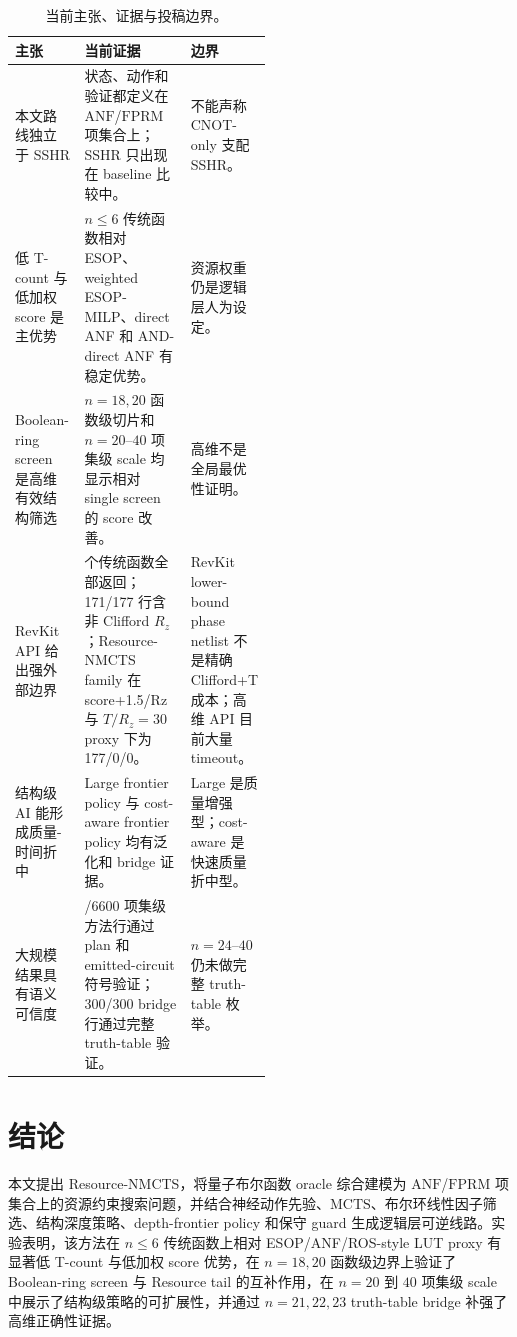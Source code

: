 \documentclass[UTF8,fontset=macnew,11pt]{ctexart}
\newcommand{\method}{Resource-NMCTS}
\newcommand{\screen}{Boolean-ring screen}
\newcommand{\anf}{\ensuremath{\mathrm{ANF}}}
\newcommand{\fprm}{\ensuremath{\mathrm{FPRM}}}
\newcommand{\mcts}{\ensuremath{\mathrm{MCTS}}}
\newcommand{\ttable}{truth-table}
\begin{document}
\begin{table}[H]
\centering
\small
\caption{当前主张、证据与投稿边界。}
\label{tab:evidence-map-v27}
\begin{tabularx}{\linewidth}{>{\raggedright\arraybackslash}p{0.27\linewidth}>{\raggedright\arraybackslash}X>{\raggedright\arraybackslash}p{0.24\linewidth}}
\toprule
主张 & 当前证据 & 边界 \\
\midrule
本文路线独立于 SSHR & 状态、动作和验证都定义在 \anf{}/\fprm{} 项集合上；SSHR 只出现在 baseline 比较中。 & 不能声称 CNOT-only 支配 SSHR。 \\
低 T-count 与低加权 score 是主优势 & $n\leq6$ 传统函数相对 ESOP、weighted ESOP-MILP、direct ANF 和 AND-direct ANF 有稳定优势。 & 资源权重仍是逻辑层人为设定。 \\
\screen{} 是高维有效结构筛选 & $n=18,20$ 函数级切片和 $n=20$--$40$ 项集级 scale 均显示相对 single screen 的 score 改善。 & 高维不是全局最优性证明。 \\
RevKit API 给出强外部边界 & 177 个传统函数全部返回；171/177 行含非 Clifford $R_z$；Resource-NMCTS family 在 score+1.5/Rz 与 $T/R_z=30$ proxy 下为 177/0/0。 & RevKit lower-bound phase netlist 不是精确 Clifford+T 成本；高维 API 目前大量 timeout。 \\
结构级 AI 能形成质量-时间折中 & Large frontier policy 与 cost-aware frontier policy 均有泛化和 bridge 证据。 & Large 是质量增强型；cost-aware 是快速质量折中型。 \\
大规模结果具有语义可信度 & 6600/6600 项集级方法行通过 plan 和 emitted-circuit 符号验证；300/300 bridge 行通过完整 \ttable{} 验证。 & $n=24$--$40$ 仍未做完整 \ttable{} 枚举。 \\
\bottomrule
\end{tabularx}
\end{table}

\section{结论}

本文提出 \method{}，将量子布尔函数 oracle 综合建模为 \anf{}/\fprm{} 项集合上的资源约束搜索问题，并结合神经动作先验、\mcts{}、布尔环线性因子筛选、结构深度策略、depth-frontier policy 和保守 guard 生成逻辑层可逆线路。实验表明，该方法在 $n\leq6$ 传统函数上相对 ESOP/ANF/ROS-style LUT proxy 有显著低 T-count 与低加权 score 优势，在 $n=18,20$ 函数级边界上验证了 \screen{} 与 Resource tail 的互补作用，在 $n=20$ 到 $40$ 项集级 scale 中展示了结构级策略的可扩展性，并通过 $n=21,22,23$ truth-table bridge 补强了高维正确性证据。
\end{document}
